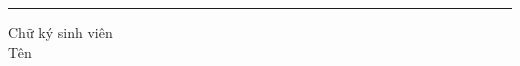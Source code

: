 \begin{flushright}
\begin{minipage}{0.3\textwidth}
    \rule{0.9\linewidth}{0.5pt} %
    \centering
    \vspace{5pt}
    Chữ ký sinh viên\\
    \vspace{2cm}
    Tên
\end{minipage}
\end{flushright}